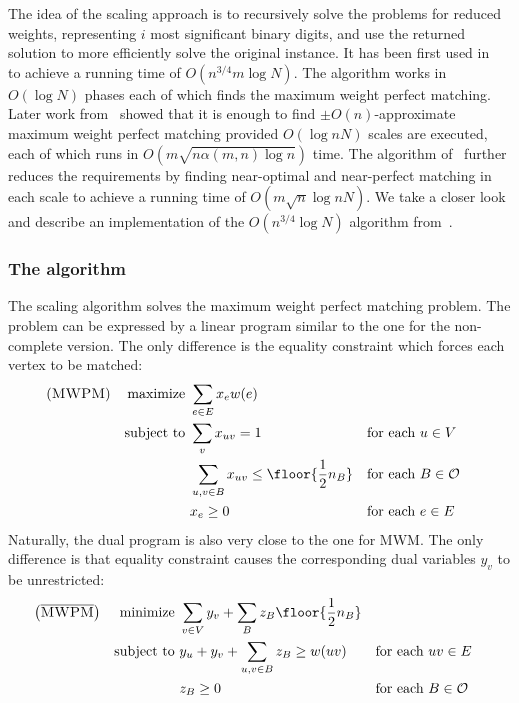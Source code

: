 The idea of the scaling approach is to recursively solve the problems for reduced weights, representing $i$ most significant binary digits, and use the returned solution to more efficiently solve the original instance. It has been first used in~\cite{gabow1985scaling} to achieve a running time of $O(n^{3/4}m \log N)$. The algorithm works in $O(\log N)$ phases each of which finds the maximum weight perfect matching. Later work from~\cite{gabow1991faster} showed that it is enough to find $\pm O(n)$-approximate maximum weight perfect matching provided $O(\log nN)$ scales are executed, each of which runs in $O(m\sqrt{n \alpha(m,n)\log n})$ time. The algorithm of~\cite{duan2018scaling} further reduces the requirements by finding near-optimal and near-perfect matching in each scale to achieve a running time of $O(m \sqrt{n} \log nN)$. We take a closer look and describe an implementation of the $O(n^{3/4}\log N)$ algorithm from~\cite{gabow1985scaling}.

\subsubsection{The algorithm}

The scaling algorithm solves the maximum weight perfect matching problem. The problem can be expressed by a linear program similar to the one for the non-complete version. The only difference is the equality constraint which forces each vertex to be matched:
\begin{align*}
\left(\textsc{MWPM}\right) && \text{maximize }   & \sum_{e \in E} x_e w(e)\\
&& \text{subject to } & \sum_v x_{uv} = 1 && \text{for each $u \in V$} \\
&& & \sum_{u, v \in B} x_{uv} \leq \floor{\frac{1}{2}n_B} && \text{for each $B \in \mathcal{O}$} \\
&& & x_e \geq 0           && \text{for each $e \in E$}
\end{align*}
Naturally, the dual program is also very close to the one for \textsc{MWM}. The only difference is that equality constraint causes the corresponding dual variables $y_v$ to be unrestricted:
\begin{align*}
\left(\overline{\textsc{MWPM}}\right) &&\text{minimize }   & \sum_{v\in V}y_v + \sum_{B} z_B \floor{\frac{1}{2}n_B} \\
&& \text{subject to } & y_u + y_v + \sum_{u, v \in B} z_B \geq w(uv) && \text{for each $uv \in E$} \\
&& & z_B \geq 0          && \text{for each $B \in \mathcal{O}$}
\end{align*}

